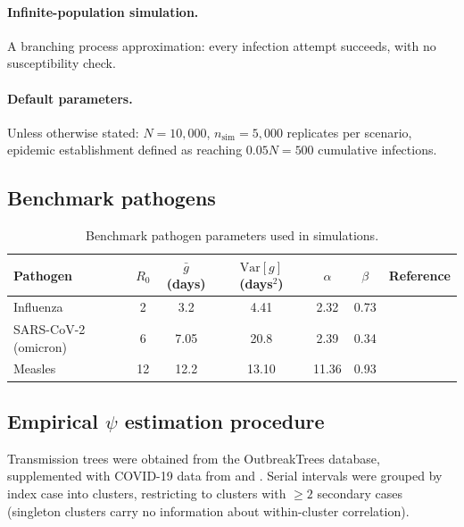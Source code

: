 \documentclass[10pt]{article}
\begin{document}
\paragraph{Infinite-population simulation.}
A branching process approximation: every infection attempt succeeds, with no susceptibility check.

\paragraph{Default parameters.}
Unless otherwise stated: $N = 10{,}000$, $n_\text{sim} = 5{,}000$ replicates per scenario, epidemic establishment defined as reaching $0.05N = 500$ cumulative infections.


\subsection{Benchmark pathogens}
\label{sec:supp_benchmarks}

\begin{table}[h]
\centering
\begin{tabular}{lcccccc}
\hline
Pathogen & $R_0$ & $\bar{g}$ (days) & $\text{Var}[g]$ (days$^2$) & $\alpha$ & $\beta$ & Reference\\
\hline
Influenza & 2 & 3.2 & 4.41 & 2.32 & 0.73 & \citet{chan_estimating_2025}\\
SARS-CoV-2 (omicron) & 6 & 7.05 & 20.8 & 2.39 & 0.34 & \citet{manica_intrinsic_2022}\\
Measles & 12 & 12.2 & 13.10 & 11.36 & 0.93 & \citet{klinkenberg_correlation_2011}\\
\hline
\end{tabular}
\caption{Benchmark pathogen parameters used in simulations.}
\label{tab:benchmark_pathogens}
\end{table}


\subsection{Empirical $\psi$ estimation procedure}
\label{sec:supp_empirical}

Transmission trees were obtained from the OutbreakTrees database\citep{taube_outbreaktrees_2022}, supplemented with COVID-19 data from \citet{ganyani_estimating_2020} and \citet{hart_generation_2022}. Serial intervals were grouped by index case into clusters, restricting to clusters with $\geq 2$ secondary cases (singleton clusters carry no information about within-cluster correlation).
\end{document}
